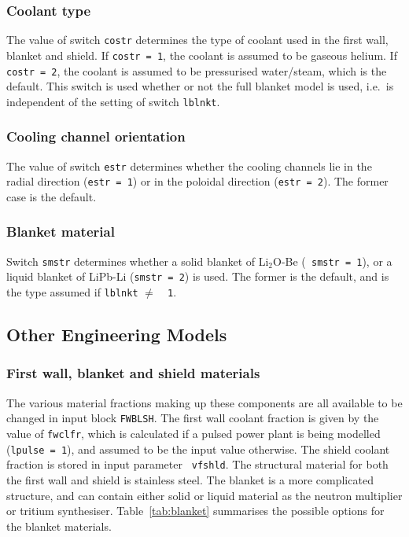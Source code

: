 \subsubsection{Coolant type}
\label{sec:costr}

The value of switch {\tt costr} determines the type of coolant used in the
first wall, blanket and shield. If {\tt costr = 1}, the coolant is assumed to
be gaseous helium. If {\tt costr = 2}, the coolant is assumed to be
pressurised water/steam, which is the default. This switch is used whether or
not the full blanket model is used, i.e.\ is independent of the setting of
switch {\tt lblnkt}.

\subsubsection{Cooling channel orientation}

The value of switch {\tt estr} determines whether the cooling channels lie in
the radial direction ({\tt estr = 1}) or in the poloidal direction ({\tt estr
= 2}). The former case is the default.

\subsubsection{Blanket material}

Switch {\tt smstr} determines whether a solid blanket of Li$_2$O-Be ({\tt
smstr = 1}), or a liquid blanket of LiPb-Li ({\tt smstr = 2}) is used. The
former is the default, and is the type assumed if {\tt lblnkt} $\not=$~{\tt
1}.

\subsection{Other Engineering Models}

\subsubsection{First wall, blanket and shield materials}
\label{sec:fwbs}

The various material fractions making up these components are all available to
be changed in input block {\tt FWBLSH}. The first wall coolant fraction is
given by the value of {\tt fwclfr}, which is calculated if a pulsed power
plant is being modelled ({\tt lpulse = 1}), and assumed to be the input value
otherwise. The shield coolant fraction is stored in input parameter {\tt
vfshld}. The structural material for both the first wall and shield is
stainless steel. The blanket is a more complicated structure, and can contain
either solid or liquid material as the neutron multiplier or tritium
synthesiser. Table~\ref{tab:blanket} summarises the possible options for the
blanket materials.

